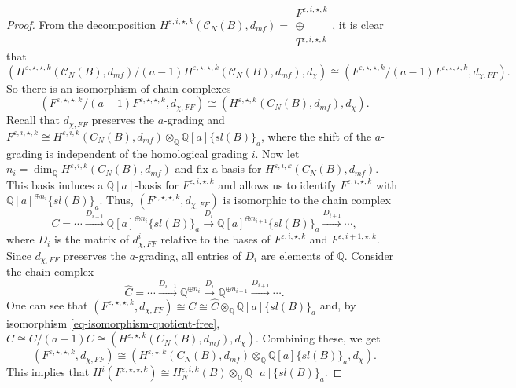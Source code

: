 \documentclass{amsart}
\theoremstyle{plain}
\theoremstyle{definition}
\theoremstyle{remark}
\numberwithin{equation}{section}
\begin{document}
\begin{proof}
From the decomposition $H^{{\varepsilon},i,\star,k}({\mathcal{C}}_N(B),d_{mf}) =  \left.\begin{array}{c}
  F^{{\varepsilon},i,\star,k} \\
  \oplus \\
  T^{{\varepsilon},i,\star,k}
\end{array}\right.$, it is clear that 
\[
(H^{{\varepsilon},\star,\star,k}({\mathcal{C}}_N(B),d_{mf})/(a-1)H^{{\varepsilon},\star,\star,k}({\mathcal{C}}_N(B),d_{mf}), d_\chi) \cong (F^{{\varepsilon},\star,\star,k}/(a-1)F^{{\varepsilon},\star,\star,k}, d_{\chi,FF}).
\]
So there is an isomorphism of chain complexes
\begin{equation}\label{eq-isomorphism-quotient-free}
(F^{{\varepsilon},\star,\star,k}/(a-1)F^{{\varepsilon},\star,\star,k}, d_{\chi,FF}) \cong (H^{{\varepsilon},\star,k}(C_N(B),d_{mf}),d_\chi).
\end{equation}
Recall that $d_{\chi,FF}$ preserves the $a$-grading and $F^{{\varepsilon},i,\star,k} \cong H^{{\varepsilon},i,k}(C_N(B),d_{mf})\otimes_{\mathbb{Q}} {\mathbb{Q}}[a]\{sl(B)\}_a$, where the shift of the $a$-grading is independent of the homological grading $i$. Now let $n_i = \dim_{\mathbb{Q}} H^{{\varepsilon},i,k}(C_N(B),d_{mf})$ and fix a basis for $H^{{\varepsilon},i,k}(C_N(B),d_{mf})$. This basis induces a ${\mathbb{Q}}[a]$-basis for $F^{{\varepsilon},i,\star,k}$ and allows us to identify $F^{{\varepsilon},i,\star,k}$ with ${\mathbb{Q}}[a]^{\oplus n_i}\{sl(B)\}_a$. Thus, $(F^{{\varepsilon},\star,\star,k}, d_{\chi,FF})$ is isomorphic to the chain complex
\[
C= \cdots \xrightarrow{D_{i-1}} {\mathbb{Q}}[a]^{\oplus n_i}\{sl(B)\}_a \xrightarrow{D_{i}} {\mathbb{Q}}[a]^{\oplus n_{i+1}}\{sl(B)\}_a \xrightarrow{D_{i+1}} \cdots,
\]
where $D_i$ is the matrix of $d^i_{\chi,FF}$ relative to the bases of $F^{{\varepsilon},i,\star,k}$ and $F^{{\varepsilon},i+1,\star,k}$. Since $d_{\chi,FF}$ preserves the $a$-grading, all entries of $D_i$ are elements of ${\mathbb{Q}}$. Consider the chain complex 
\[
\hat{C}= \cdots \xrightarrow{D_{i-1}} {\mathbb{Q}}^{\oplus n_i} \xrightarrow{D_{i}} {\mathbb{Q}}^{\oplus n_{i+1}} \xrightarrow{D_{i+1}} \cdots.
\]
One can see that $(F^{{\varepsilon},\star,\star,k}, d_{\chi,FF}) \cong C \cong \hat{C} \otimes_{\mathbb{Q}} {\mathbb{Q}}[a] \{sl(B)\}_a$ and, by isomorphism \eqref{eq-isomorphism-quotient-free}, $\hat{C} \cong C/(a-1)C \cong (H^{{\varepsilon},\star,k}(C_N(B),d_{mf}),d_\chi)$. Combining these, we get 
\[
(F^{{\varepsilon},\star,\star,k}, d_{\chi,FF}) \cong (H^{{\varepsilon},\star,k}(C_N(B),d_{mf})\otimes_{\mathbb{Q}} {\mathbb{Q}}[a] \{sl(B)\}_a,d_\chi).
\] 
This implies that $H^i(F^{{\varepsilon},\star,\star,k}) \cong H_N^{{\varepsilon},i,k}(B)\otimes_{\mathbb{Q}} {\mathbb{Q}}[a]\{sl(B)\}_a$.
\end{proof}
\end{document}
